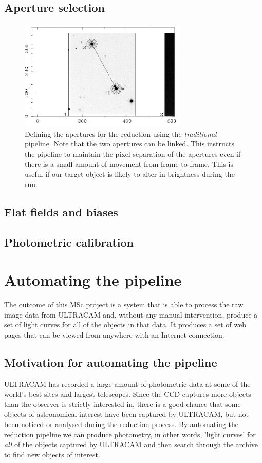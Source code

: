 \subsection{Aperture selection}

\begin{figure}[!h]
\centering
\includegraphics[width=80mm]{images/setaper.png}
\caption{Defining the apertures for the reduction using the \emph{traditional} pipeline. Note that the two apertures can be linked. This instructs the pipeline to maintain the pixel separation of the apertures even if there is a small amount of movement from frame to frame. This is useful if our target object is likely to alter in brightness during the run. }
\label{fig:nnsercomparisontom}
\end{figure}


\subsection{Flat fields and biases}

\subsection{Photometric calibration}

\section{Automating the pipeline}

The outcome of this MSc project is a system that is able to process the raw image data from ULTRACAM and, without any manual intervention, produce a set of light curves for all of the objects in that data. It produces a set of web pages that can be viewed from anywhere with an Internet connection. 

\subsection{Motivation for automating the pipeline}
ULTRACAM has recorded a large amount of photometric data at some of the world's best sites and largest telescopes. Since the CCD captures more objects than the observer is strictly interested in, there is a good chance that some objects of astronomical interest have been captured by ULTRACAM, but not been noticed or analysed during the reduction process. By automating the reduction pipeline we can produce photometry, in other words, 'light curves' for \emph{all} of the objects captured by ULTRACAM and then search through the archive to find new objects of interest. 

